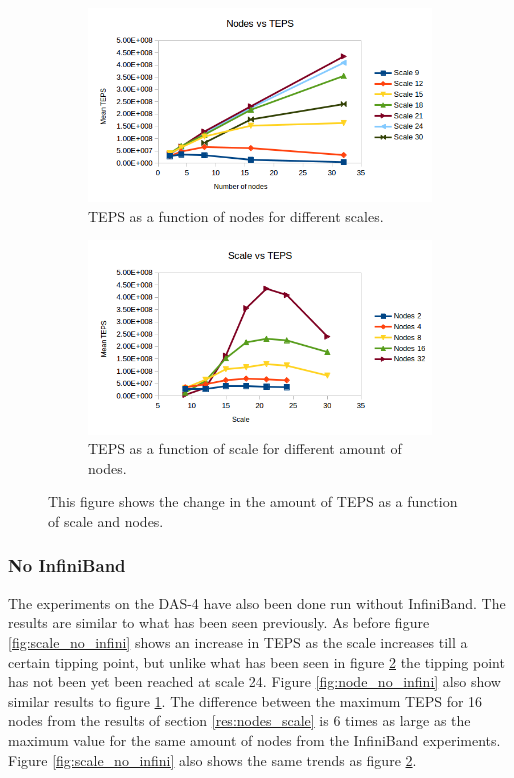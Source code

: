 \begin{figure}[!h]
\centering
\begin{subfigure}{.5\textwidth}
  \centering
  \includegraphics[width=\linewidth]{images/nodes_no_val.png}
  \caption{TEPS as a function of nodes for different scales.}
  \label{fig:nodes_no_val}
\end{subfigure}%
\begin{subfigure}{.5\textwidth}
  \centering
  \includegraphics[width=\linewidth]{images/scale_no_val.png}
  \caption{TEPS as a function of scale for different amount of nodes.}
  \label{fig:scale_no_val}
\end{subfigure}
\caption{This figure shows the change in the amount of TEPS as a function of scale and nodes.}
\label{fig:das_no_val}
\end{figure}

\subsubsection{No InfiniBand}
The experiments on the DAS-4 have also been done run without InfiniBand. The results are similar to what has been seen previously. As before figure \ref{fig:scale_no_infini} shows an increase in TEPS as the scale increases till a certain tipping point, but unlike what has been seen in figure \ref{fig:scale_no_val} the tipping point has not been yet been reached at scale 24.
 Figure \ref{fig:node_no_infini} also show similar results to figure \ref{fig:nodes_no_val}. The difference between the maximum TEPS for 16 nodes from the results of section \ref{res:nodes_scale} is 6 times as large as the maximum value for the same amount of nodes from the InfiniBand experiments.
Figure \ref{fig:scale_no_infini} also shows the same trends as figure \ref{fig:scale_no_val}. 
 
